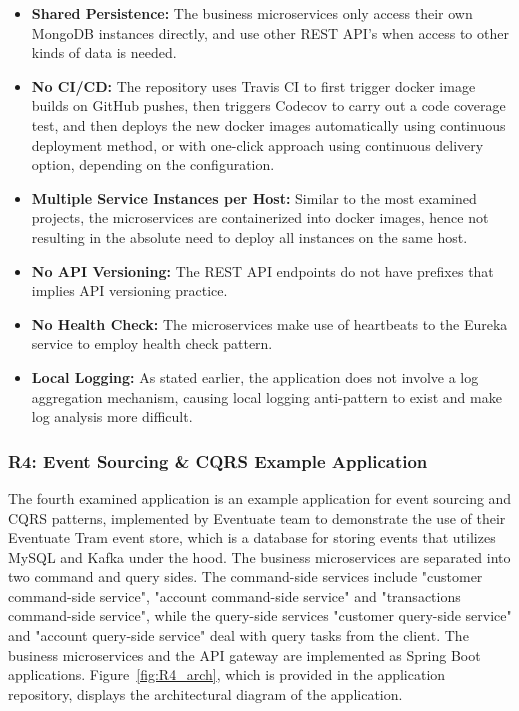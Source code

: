 \documentclass{Configuration_Files/PoliMi3i_thesis}
\begin{document}
\begin{itemize}
    \item \textbf{Shared Persistence:} The business microservices only access their own MongoDB instances directly, and use other REST API's when access to other kinds of data is needed.
    
    \item \textbf{No CI/CD:} The repository uses Travis CI\footnotemark[81] to first trigger docker image builds on GitHub pushes, then triggers Codecov\footnotemark[82] to carry out a code coverage test, and then deploys the new docker images automatically using continuous deployment method, or with one-click approach using continuous delivery option, depending on the configuration.
    
    \item \textbf{Multiple Service Instances per Host:} Similar to the most examined projects, the microservices are containerized into docker images, hence not resulting in the absolute need to deploy all instances on the same host.
    
    \item \textbf{No API Versioning:} The REST API endpoints do not have prefixes that implies API versioning practice.
    
    \item \textbf{No Health Check:} The microservices make use of heartbeats to the Eureka service to employ health check pattern.
    
    \item \textbf{Local Logging:} As stated earlier, the application does not involve a log aggregation mechanism, causing local logging anti-pattern to exist and make log analysis more difficult.
\end{itemize}

\subsubsection{R4: Event Sourcing \& CQRS Example Application}
\label{subsubsec:R4}

The fourth examined application is an example application for event sourcing and CQRS patterns, implemented by Eventuate\footnotemark[83] team to demonstrate the use of their Eventuate Tram event store, which is a database for storing events that utilizes MySQL and Kafka under the hood.
The business microservices are separated into two command and query sides.
The command-side services include "customer command-side service", "account command-side service" and "transactions command-side service", while the query-side services "customer query-side service" and "account query-side service" deal with query tasks from the client.
The business microservices and the API gateway are implemented as Spring Boot applications.
Figure~\ref{fig:R4_arch}, which is provided in the application repository, displays the architectural diagram of the application.
\end{document}
